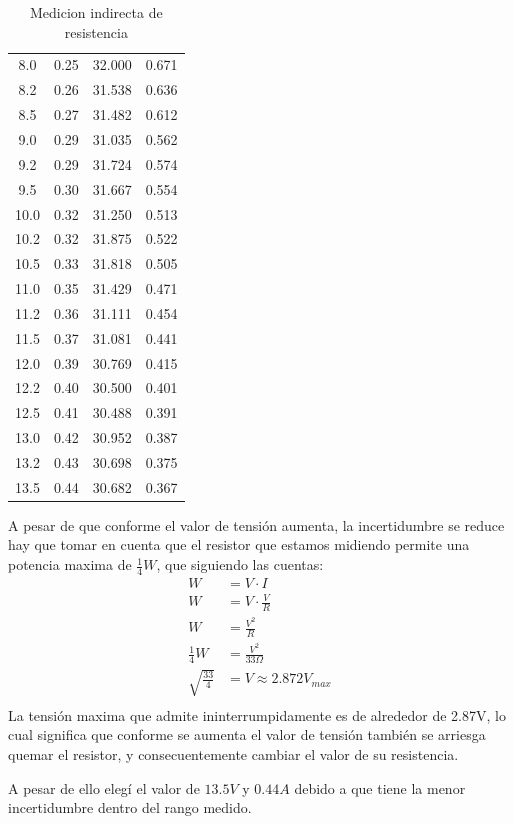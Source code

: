 \documentclass[12pt]{article}
\begin{document}
\begin{table}[htbp]
\begin{tabular}{|c|c|c|c|}
         8.0& 0.25& 32.000& 0.671\\
         8.2& 0.26& 31.538& 0.636\\
         8.5& 0.27& 31.482& 0.612\\
         9.0& 0.29& 31.035& 0.562\\
         9.2& 0.29& 31.724& 0.574\\
         9.5& 0.30& 31.667& 0.554\\
         10.0& 0.32& 31.250& 0.513\\
         10.2& 0.32& 31.875& 0.522\\
         10.5& 0.33& 31.818& 0.505\\
         11.0& 0.35& 31.429& 0.471\\
         11.2& 0.36& 31.111& 0.454\\
         11.5& 0.37& 31.081& 0.441\\
         12.0& 0.39& 30.769& 0.415\\
         12.2& 0.40& 30.500& 0.401\\
         12.5& 0.41& 30.488& 0.391\\
         13.0& 0.42& 30.952& 0.387\\
         13.2& 0.43& 30.698& 0.375\\
         13.5& 0.44& 30.682& 0.367\\
        \hline
    \end{tabular}
    \caption{Medicion indirecta de resistencia}
    \label{tab:mediciones2}
\end{table}
\newpage
 A pesar de que conforme el valor de tensión aumenta, la incertidumbre se reduce hay que tomar en cuenta que el resistor que estamos midiendo permite una potencia maxima de $\frac{1}{4}W$, que siguiendo las cuentas:
 \begin{align}
    W &= V \cdot I\\
    W &= V \cdot \frac{V}{R}\\
    W &= \frac{V^2}{R}\\
    \frac{1}{4}W &= \frac{V^2}{33\Omega}\\
    \sqrt{\frac{33}{4}} &= V \approx 2.872V_{max}\\
 \end{align}
 La tensión maxima que admite ininterrumpidamente es de alrededor de 2.87V, lo cual significa que conforme se aumenta el valor de tensión también se arriesga quemar el resistor, y consecuentemente cambiar el valor de su resistencia.

 A pesar de ello elegí el valor de $13.5V$ y $0.44A$ debido a que tiene la menor incertidumbre dentro del rango medido.
\end{document}
